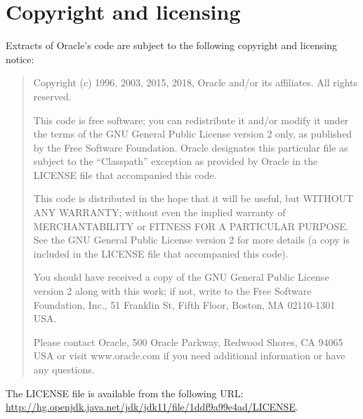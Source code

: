 \section*{Copyright and licensing}

Extracts of Oracle's code are subject to the following copyright and licensing notice:

\begin{quote}
Copyright (c) 1996, 2003, 2015, 2018, Oracle and/or its affiliates. All rights reserved.

This code is free software; you can redistribute it and/or modify it
under the terms of the GNU General Public License version 2 only, as
published by the Free Software Foundation.  Oracle designates this
particular file as subject to the ``Classpath'' exception as provided
by Oracle in the LICENSE file that accompanied this code.

This code is distributed in the hope that it will be useful, but WITHOUT
ANY WARRANTY; without even the implied warranty of MERCHANTABILITY or
FITNESS FOR A PARTICULAR PURPOSE.  See the GNU General Public License
version 2 for more details (a copy is included in the LICENSE file that
accompanied this code).

You should have received a copy of the GNU General Public License version
2 along with this work; if not, write to the Free Software Foundation,
Inc., 51 Franklin St, Fifth Floor, Boston, MA 02110-1301 USA.

Please contact Oracle, 500 Oracle Parkway, Redwood Shores, CA 94065 USA
or visit www.oracle.com if you need additional information or have any
questions.
\end{quote}

\noindent
The LICENSE file is available from the following URL: 
\url{http://hg.openjdk.java.net/jdk/jdk11/file/1ddf9a99e4ad/LICENSE}.


